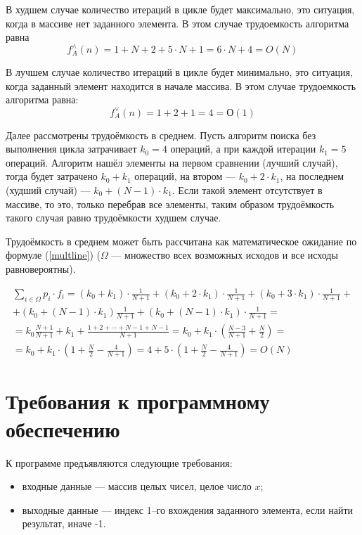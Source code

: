 В худшем случае количество итераций в цикле будет максимально, это ситуация, когда в массиве нет заданного элемента. 
В этом случае трудоемкость алгоритма равна
\begin{equation}
	\label{for:m1}
	{f^\wedge_{A}}(n) = 1 + N + 2 + 5 \cdot N + 1 = 6 \cdot N + 4 = O(N)
\end{equation}

В лучшем случае количество итераций в цикле будет минимально, это ситуация, когда заданный элемент находится в начале массива.
В этом случае трудоемкость алгоритма равна:
\begin{equation}
	\label{for:m2}
	{f^\vee_{A}}(n) = 1 + 2 + 1 = 4 = О(1)
\end{equation}

Далее рассмотрены трудоёмкость в среднем.
Пусть алгоритм поиска без выполнения цикла затрачивает $k_0 = 4$ операций, а при каждой итерации $k_1 = 5$ операций. 
Алгоритм нашёл элементы на первом сравнении (лучший случай), тогда будет затрачено $k_0 + k_1$ операций, на втором --- $k_0 + 2\cdot k_1$, на последнем (худший случай) --- $k_0 + (N - 1) \cdot k_1$. 
Если такой элемент отсутствует в массиве, то это, только перебрав все элементы, таким образом трудоёмкость такого случая равно трудоёмкости худшем случае.

Трудоёмкость в среднем может быть рассчитана как математическое ожидание по формуле (\ref{multline}) ($\Omega$ --- множество всех возможных исходов и все исходы равновероятны).

\begin{multline}
	\label{multline}
	\sum\limits_{i \in \Omega} p_i \cdot f_i = (k_0 + k_1) \cdot \frac{1}{N + 1} + (k_0 + 2 \cdot k_1) \cdot \frac{1}{N+1} + (k_0 + 3 \cdot k_1) \cdot \frac{1}{N + 1} + \\+ (k_0 + (N - 1) \cdot k_1)\frac{1}{N + 1} + (k_0 + (N - 1) \cdot k_1) \cdot \frac{1}{N + 1} = \\= k_0\frac{N+1}{N+1}+k_1+\frac{1 + 2 + \cdots + N - 1 + N - 1}{N + 1} = k_0 + k_1 \cdot \left(\frac{N - 3}{N + 1} + \frac{N}{2}\right) =\\= k_0 + k_1 \cdot \left(1 + \frac{N}{2} - \frac{4}{N + 1}\right) = 4 + 5 \cdot \left(1 + \frac{N}{2} - \frac{4}{N + 1}\right) = O(N)
\end{multline}

\section{Требования к программному обеспечению}
К программе предъявляются следующие требования:
\begin{itemize}[label=---]
	\item входные данные --- массив целых чисел, целое число $x$;
	\item выходные данные --- индекс 1--го вхождения заданного элемента, если найти результат, иначе -1.
\end{itemize}

